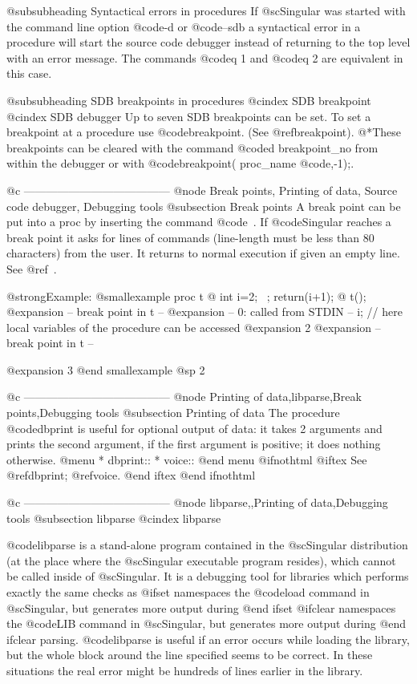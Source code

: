 {{{@subsubheading Syntactical errors in procedures
If @sc{Singular} was started with the command line option @code{-d} or
@code{--sdb} a syntactical error in a procedure will start the
source code debugger instead of returning to the top level with an
error message. The commands @code{q 1} and @code{q 2} are equivalent in this
case.

@subsubheading SDB breakpoints in procedures
@cindex SDB breakpoint
@cindex SDB debugger
Up to seven SDB breakpoints can be set.
To set a breakpoint at a procedure use
@code{breakpoint}. (See @ref{breakpoint}).
@*These breakpoints can be cleared with the command @code{d breakpoint_no}
from within the debugger or with
@code{breakpoint(} proc_name @code{,-1);}.


@c ---------------------------------------
@node Break points, Printing of data, Source code debugger, Debugging tools
@subsection Break points
A break point can be put into a proc by inserting the command @code{~}.
If @code{Singular} reaches a break point it asks for lines of commands
(line-length must be less than 80 characters)
from the user. It returns to normal execution if given an empty line.
See @ref{~}.


@strong{Example:}
@smallexample
proc t
@{
  int i=2;
  ~;
  return(i+1);
@}
t();
@expansion{} -- break point in t --
@expansion{} -- 0: called    from STDIN --
i;               // here local variables of the procedure can be accessed
@expansion{} 2
@expansion{} -- break point in t --

@expansion{} 3
@end smallexample
@sp 2

@c ---------------------------------------
@node Printing of data,libparse,Break points,Debugging tools
@subsection Printing of data
The procedure @code{dbprint} is useful for optional output of data:
it takes 2 arguments and prints the second argument, if the first
argument is positive; it does nothing otherwise.
@menu
* dbprint::
* voice::
@end menu
@ifnothtml
@iftex
See @ref{dbprint}; @ref{voice}.
@end iftex
@end ifnothtml

@c ---------------------------------------
@node libparse,,Printing of data,Debugging tools
@subsection libparse
@cindex libparse

@code{libparse} is a stand-alone program contained in the @sc{Singular}
distribution (at the place where the @sc{Singular} executable program
resides), which cannot be called inside of @sc{Singular}. It is a
debugging tool for libraries which performs exactly the same checks as
@ifset namespaces
the @code{load} command in @sc{Singular}, but generates more output during
@end ifset
@ifclear namespaces
the @code{LIB} command in @sc{Singular}, but generates more output during
@end ifclear
parsing.  @code{libparse} is useful if an error
occurs while loading the library, but the whole block around the line
specified seems to be correct. In these situations the real error might
be hundreds of lines earlier in the library.

}}}
